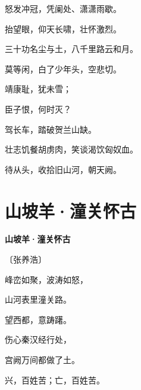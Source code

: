 \documentclass[12pt,UTF-8,openany,fontset=none]{ctexbook}
\begin{document}
\begin{center}
    \begin{Large}

        怒发冲冠，凭阑处、潇潇雨歇。

        抬望眼，仰天长啸，壮怀激烈。
        
        三十功名尘与土，八千里路云和月。
        
        莫等闲，白了少年头，空悲切。

        \vspace{18pt}  %

        靖康耻，犹未雪；

        臣子恨，何时灭？

        驾长车，踏破贺兰山缺。

        壮志饥餐胡虏肉，笑谈渴饮匈奴血。

        待从头，收拾旧山河，朝天阙。

    \end{Large}

\end{center}

\vspace{8pt}
\clearpage

\section{山坡羊·潼关怀古}


\begin{center}
    {\bfseries 山坡羊·潼关怀古}

    \vspace{18pt}

    \begin{large}\xuwen
        〔张养浩〕
    \end{large}

\end{center}

    \vspace{18pt}  %

\begin{center}
    \begin{Large}

        峰峦如聚，波涛如怒，

        山河表里潼关路。

        望西都，意踌躇。

        \vspace{18pt}  %

        伤心秦汉经行处，

        宫阙万间都做了土。

        兴，百姓苦；亡，百姓苦。

    \end{Large}

\end{center}
\end{document}
